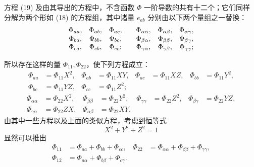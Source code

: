 \documentclass[11pt,a4paper,leqno]{article}
\begin{document}
方程 (19) 及由其导出的方程中，不含函数 $\Phi$ 一阶导数的共有十二个；它们同样
分解为两个形如 (18) 的方程组，其中诸量 $e_{ab}$ 分别由以下两个量组之一替换：
\[
\begin{array}{ccc@{\qquad}ccc}
\Phi_{aa},&\Phi_{ab},&\Phi_{ac},&
\Phi_{\alpha\alpha},&\Phi_{\alpha\beta},&\Phi_{\alpha\gamma},\\
\Phi_{ba},&\Phi_{bb},&\Phi_{bc},&
\Phi_{\beta\alpha},&\Phi_{\beta\beta},&\Phi_{\beta\gamma},\\
\Phi_{ca},&\Phi_{cb},&\Phi_{cc};&
\Phi_{\gamma\alpha},&\Phi_{\gamma\beta},&\Phi_{\gamma\gamma};
\end{array}
\]

所以存在这样的量 $\Phi_{11},\Phi_{22}$，使下列方程成立：
\[
\begin{aligned}
\Phi_{aa}&=\Phi_{11}X^2,&\Phi_{ab}&=\Phi_{11}XY,&
\Phi_{ac}&=\Phi_{11}XZ,&\Phi_{bb}&=\Phi_{11}Y^2,\\
\Phi_{bc}&=\Phi_{11}YZ,&\Phi_{cc}&=\Phi_{11}Z^2;
\end{aligned}
\]
\[
\begin{aligned}
\Phi_{\alpha\alpha}&=\Phi_{22}X^2,&\Phi_{\beta\beta}&=\Phi_{22}Y^2,&
\Phi_{\gamma\gamma}&=\Phi_{22}Z^2,&\Phi_{\beta\gamma}&=\Phi_{22}YZ,\\
\Phi_{\gamma\alpha}&=\Phi_{22}ZX,&\Phi_{\alpha\beta}&=\Phi_{22}XY.
\end{aligned}
\]
由其中一些方程以及上面的类似方程，考虑到恒等式
\[
X^2+Y^2+Z^2=1
\]
显然可以推出
\begin{equation}\tag{20}
\begin{aligned}
\Phi_{11}&=\Phi_{aa}+\Phi_{bb}+\Phi_{cc},
&\Phi_{22}&=\Phi_{\alpha\alpha}+\Phi_{\beta\beta}+\Phi_{\gamma\gamma},\\
\Phi_{12}&=\Phi_{a\alpha}+\Phi_{b\beta}+\Phi_{c\gamma}.
\end{aligned}
\end{equation}
\end{document}
